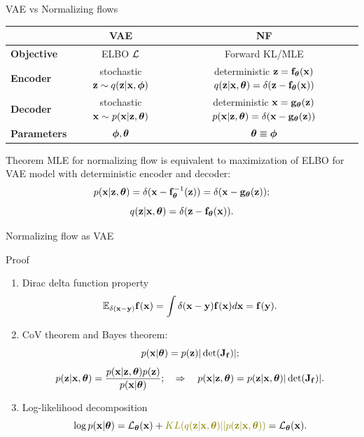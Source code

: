 \documentclass{beamer}
\begin{document}
\begin{frame}{VAE vs Normalizing flows}
	\begin{table}[]
		\begin{tabular}{l|c|c}
			& \textbf{VAE} & \textbf{NF} \\ \hline
			\textbf{Objective} & ELBO $\mathcal{L}$ & Forward KL/MLE \\ \hline
			\textbf{Encoder} & \shortstack{stochastic \\ $\mathbf{z} \sim q (\mathbf{z} | \mathbf{x}, \boldsymbol{\phi})$} &  \shortstack{\\ deterministic \\ $\mathbf{z} = \mathbf{f}_{\boldsymbol{\theta}}(\mathbf{x})$ \\ $q(\mathbf{z} | \mathbf{x}, \boldsymbol{\theta}) = \delta(\mathbf{z} - \mathbf{f}_{\boldsymbol{\theta}}(\mathbf{x}))$}  \\ \hline
			\textbf{Decoder} & \shortstack{stochastic \\ $\mathbf{x} \sim p (\mathbf{x} | \mathbf{z}, \boldsymbol{\theta})$} & \shortstack{\\ deterministic \\ $\mathbf{x} = \mathbf{g}_{\boldsymbol{\theta}}(\mathbf{z})$ \\ $ p(\mathbf{x} | \mathbf{z}, \boldsymbol{\theta}) = \delta(\mathbf{x} - \mathbf{g}_{\boldsymbol{\theta}}(\mathbf{z}))$} \\ \hline
			\textbf{Parameters}  & $\boldsymbol{\phi}, \boldsymbol{\theta}$ & $\boldsymbol{\theta} \equiv \boldsymbol{\phi}$\\ 
		\end{tabular}
	\end{table}
	\begin{block}{Theorem}
		MLE for normalizing flow is equivalent to maximization of ELBO for VAE model with deterministic encoder and decoder:
		\vspace{-0.3cm}
		\[
			p(\mathbf{x} | \mathbf{z}, \boldsymbol{\theta}) = \delta (\mathbf{x} - \mathbf{f}^{-1}_{\boldsymbol{\theta}}(\mathbf{z})) = \delta (\mathbf{x} - \mathbf{g}_{\boldsymbol{\theta}}(\mathbf{z}));
		\]
		\[
			q(\mathbf{z} | \mathbf{x}, \boldsymbol{\theta}) = \delta (\mathbf{z} - \mathbf{f}_{\boldsymbol{\theta}}(\mathbf{x})).
		\]
	\end{block}
\end{frame}
\begin{frame}{Normalizing flow as VAE}
	\begin{block}{Proof}
		\begin{enumerate}
			\item Dirac delta function property 
			\[
				\mathbb{E}_{\delta(\mathbf{x} - \mathbf{y})} \mathbf{f}(\mathbf{x}) = \int \delta(\mathbf{x} - \mathbf{y}) \mathbf{f}(\mathbf{x}) d \mathbf{x} = \mathbf{f}(\mathbf{y}).
			\]
			\item CoV theorem and Bayes theorem:
			\[
				p(\mathbf{x} | \boldsymbol{\theta}) = p(\mathbf{z}) |\det (\mathbf{J}_{\mathbf{f}})|;
			\]
			\[
				p(\mathbf{z} | \mathbf{x}, \boldsymbol{\theta}) = \frac{p(\mathbf{x} | \mathbf{z}, \boldsymbol{\theta}) p(\mathbf{z})}{p(\mathbf{x} | \boldsymbol{\theta})}; \quad \Rightarrow \quad p(\mathbf{x} | \mathbf{z}, \boldsymbol{\theta}) = p(\mathbf{z} | \mathbf{x}, \boldsymbol{\theta}) |\det (\mathbf{J}_{\mathbf{f}})|.
			\]
			\item Log-likelihood decomposition
			\[
				\log p(\bx | \btheta) = \cL_{\btheta}(\bx) + {\color{olive}KL(q(\bz | \bx, \btheta) || p(\bz | \bx, \btheta))} = \cL_{\btheta}(\bx).
			\]
		\end{enumerate}
	\end{block}
\end{frame}
\end{document}
